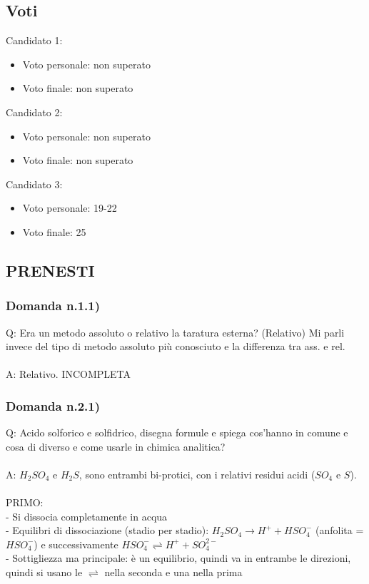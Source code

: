 \documentclass{article}
\begin{document}
\subsection{Voti}
Candidato 1: 
\begin{itemize}
	\item Voto personale: non superato
	\item Voto finale: non superato
\end{itemize}
Candidato 2: 
\begin{itemize}
	\item Voto personale: non superato
	\item Voto finale: non superato
\end{itemize}
Candidato 3: 
\begin{itemize}
	\item Voto personale: 19-22
	\item Voto finale: 25
\end{itemize}
\newpage
\subsection{PRENESTI}
\subsubsection{Domanda n.1.1)}
Q: Era un metodo assoluto o relativo la taratura esterna? (Relativo) Mi parli invece del tipo di metodo assoluto più conosciuto e la differenza tra ass. e rel.
\\\\
A: Relativo. INCOMPLETA
\subsubsection{Domanda n.2.1)}
Q: Acido solforico e solfidrico, disegna formule e spiega cos'hanno in comune e cosa di diverso e come usarle in chimica analitica?
\\\\
A: $H_2SO_4$ e $H_2S$, sono entrambi bi-protici, con i relativi residui acidi ($SO_4$ e $S$).
\\\\ 
PRIMO:
\\- Si dissocia completamente in acqua
\\- Equilibri di dissociazione (stadio per stadio): $H_2SO_4 \rightarrow H^+ + HSO_4^-$ (anfolita = $HSO_4^-$) e successivamente $HSO_4^- \rightleftharpoons H^+ + SO_4^{2-}$
\\- Sottigliezza ma principale: è un equilibrio, quindi va in entrambe le direzioni, quindi si usano le $\rightleftharpoons$ nella seconda e una nella prima
\end{document}
